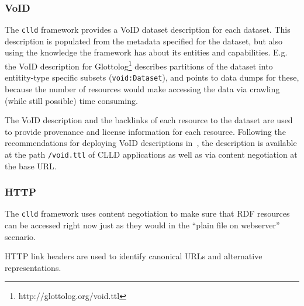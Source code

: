 \documentclass[a4paper,10pt]{article}
\begin{document}
\subsubsection{VoID}
\label{sec:void}
The \texttt{clld} framework provides a VoID dataset description for each dataset. This description is populated from
the metadata specified for the dataset, but also using the knowledge the framework has about its entities and capabilities.
E.g. the VoID description for Glottolog\footnote{http://glottolog.org/void.ttl} describes
partitions of the dataset into entitity-type specific subsets (\texttt{void:Dataset}),
and points to data dumps for these, because the number of resources would make accessing
the data via crawling (while still possible) time consuming.

The VoID description and the backlinks of each resource to the dataset are used to provide
provenance and license information for each resource. Following the recommendations for
deploying VoID descriptions in~\cite{void}, the description is available at the path
\texttt{/void.ttl} of CLLD applications as well as via content negotiation at the base URL.


\subsubsection{HTTP}


The \texttt{clld} framework uses content negotiation %
to make sure that RDF resources can be accessed right now just as they would in the ``plain file on webserver'' scenario.

HTTP link headers are used to identify canonical URLs and alternative representations. %
\end{document}
